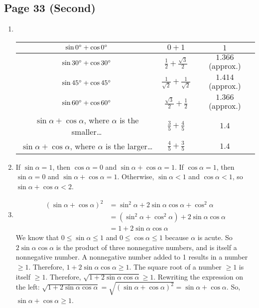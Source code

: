 \documentclass{article}
\newenvironment{solutions}[1]
{\subsection*{#1}
 \begin{enumerate}[leftmargin=1.5em]}
{\end{enumerate}}
\newcommand{\solution}{\item}
\begin{document}
\begin{solutions}{Page 33 (Second)}
\solution ~%
\begin{center}
\bgroup
\def\arraystretch{2}
\setlength\tabcolsep{15pt}
\begin{tabular}{ |c|c|c| }
\hline
$\sin{0\degree} + \cos{0\degree}$ & $0 + 1$        & $1$ \\
\hline
$\sin{30\degree} + \cos{30\degree}$ & $\frac{1}{2} + \frac{\sqrt{3}}{2}$        & $1.366$ (approx.) \\
\hline
$\sin{45\degree} + \cos{45\degree}$ & $\frac{1}{\sqrt{2}} + \frac{1}{\sqrt{2}}$ & $1.414$ (approx.) \\
\hline
$\sin{60\degree} + \cos{60\degree}$ & $\frac{\sqrt{3}}{2} + \frac{1}{2}$        & $1.366$ (approx.) \\
\hline
\makecell{$\sin{\alpha} + \cos{\alpha}$, where $\alpha$\\ is the smaller\ldots} & $\frac{3}{5} + \frac{4}{5}$ & $1.4$ \\
\hline
\makecell{$\sin{\alpha} + \cos{\alpha}$, where $\alpha$\\ is the larger\ldots}  & $ \frac{4}{5} + \frac{3}{5}$ & $1.4$ \\
\hline
\end{tabular}
\egroup
\end{center}

\solution %
If $\sin{\alpha} = 1$, then $\cos{\alpha} = 0$ and $\sin{\alpha} + \cos{\alpha} = 1$.
If $\cos{\alpha} = 1$, then $\sin{\alpha} = 0$ and $\sin{\alpha} + \cos{\alpha} = 1$.
Otherwise, $\sin{\alpha} < 1$ and $\cos{\alpha} < 1$, so $\sin{\alpha} + \cos{\alpha} < 2$.

\solution %
\begin{align*}
(\sin{\alpha} + \cos{\alpha})^2 &= \sin^{2}{\alpha} + 2\sin{\alpha}\cos{\alpha} + \cos^{2}{\alpha} \\
&= (\sin^{2}{\alpha} + \cos^{2}{\alpha}) + 2\sin{\alpha}\cos{\alpha} \\
&= 1 + 2\sin{\alpha}\cos{\alpha}
\end{align*}
We know that $0 \leq \sin{\alpha} \leq 1$ and $0 \leq \cos{\alpha} \leq 1$ because $\alpha$ is acute.
So $2\sin{\alpha}\cos{\alpha}$ is the product of three nonnegative numbers, and is itself a nonnegative number.
A nonnegative number added to 1 results in a number $\geq 1$.
Therefore, $1 + 2\sin{\alpha}\cos{\alpha} \geq 1$.
The square root of a number $\geq 1$ is itself $\geq 1$.
Therefore, $\sqrt{1 + 2\sin{\alpha}\cos{\alpha}} \geq 1$.
Rewriting the expression on the left: $\sqrt{1 + 2\sin{\alpha}\cos{\alpha}} = \sqrt{(\sin{\alpha} + \cos{\alpha})^2} = \sin{\alpha} + \cos{\alpha}$.
So, $\sin{\alpha} + \cos{\alpha} \geq 1$.


\end{solutions}
\end{document}
